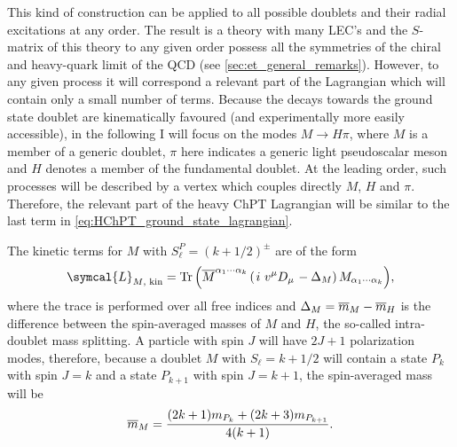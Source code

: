 This kind of construction can be applied to all possible doublets and their radial excitations at any order. The result is a theory with many LEC's and the $S$-matrix of this theory to any given order possess all the symmetries of the chiral and heavy-quark limit of the QCD (see \ref{sec:et_general_remarks}). However, to any given process it will correspond a relevant part of the Lagrangian which will contain only a small number of terms. Because the decays towards the ground state doublet are kinematically favoured (and experimentally more easily accessible), in the following I will focus on the modes $M \to H \pi $, where $M$ is a member of a generic doublet, $\pi$ here indicates a generic light pseudoscalar meson and $H$ denotes a member of the fundamental doublet. At the leading order, such processes will be described by a vertex which couples directly $M$, $H$ and $\pi$. Therefore, the relevant part of the heavy ChPT Lagrangian will be similar to the last term in \ref{eq:HChPT_ground_state_lagrangian}. 

The kinetic terms for $M$ with $S_\ell^P = \left( k + 1 / 2 \right)^\pm$ are of the form
\begin{equation}
  \symcal{L}_{M \text{, kin}} = \tr{\left( \adj{M}^{\alpha_1 \cdots \alpha_k} \left( \left. i \ v^\mu D_\mu \right. - \Delta_M \right) M_{\alpha_1 \cdots \alpha_k} \right)} ,
\end{equation}
where the trace is performed over all free indices and $\Delta_M = \overline{m}_M - \overline{m}_H$ is the difference between the spin-averaged masses of $M$ and $H$, the so-called intra-doublet mass splitting. A particle with spin $J$ will have $2 J + 1$ polarization modes, therefore, because a doublet $M$ with $S_\ell = k + 1 / 2 $ will contain a state $P_k$ with spin $J = k$ and a state $P_{k + 1}$ with spin $J = k + 1$, the spin-averaged mass will be
\begin{equation}
  \overline{m}_M = \frac{(2 k + 1) m_{P_k} + (2 k + 3) m_{P_{k + 1}}}{4 ( k + 1) } .
\end{equation}

